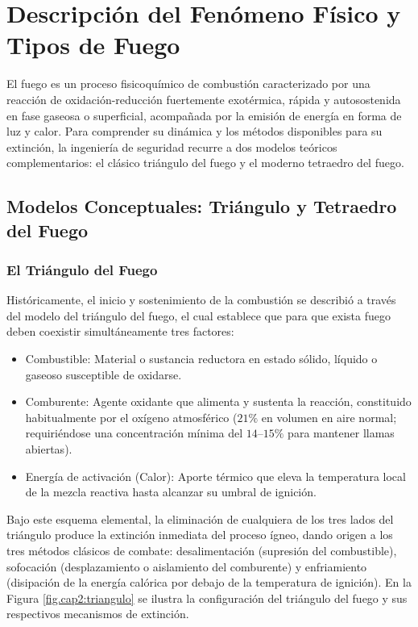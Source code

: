 \chapter{Descripción del Fenómeno Físico y Tipos de Fuego}
\label{sec.cap2:fenomeno_fisico}

El fuego es un proceso fisicoquímico de combustión caracterizado por una reacción de oxidación-reducción fuertemente
exotérmica, rápida y autosostenida en fase gaseosa o superficial, acompañada por la emisión de energía en forma de luz
y calor. Para comprender su dinámica y los métodos disponibles para su extinción, la ingeniería de seguridad recurre a
dos modelos teóricos complementarios: el clásico triángulo del fuego y el moderno tetraedro del fuego.

\section{Modelos Conceptuales: Triángulo y Tetraedro del Fuego}
\label{sec.cap2:modelos_fuego}

\subsection{El Triángulo del Fuego}

Históricamente, el inicio y sostenimiento de la combustión se describió a través del modelo del triángulo del fuego,
el cual establece que para que exista fuego deben coexistir simultáneamente tres factores:

\begin{itemize}
    \item Combustible: Material o sustancia reductora en estado sólido, líquido o gaseoso susceptible de oxidarse.
    \item Comburente: Agente oxidante que alimenta y sustenta la reacción, constituido habitualmente por el oxígeno
          atmosférico ($21\percent$ en volumen en aire normal; requiriéndose una concentración mínima del $14\text{--}15\percent$
          para mantener llamas abiertas).
    \item Energía de activación (Calor): Aporte térmico que eleva la temperatura local de la mezcla reactiva hasta
          alcanzar su umbral de ignición.
\end{itemize}

Bajo este esquema elemental, la eliminación de cualquiera de los tres lados del triángulo produce la extinción inmediata
del proceso ígneo, dando origen a los tres métodos clásicos de combate: desalimentación (supresión del combustible),
sofocación (desplazamiento o aislamiento del comburente) y enfriamiento (disipación de la energía calórica por debajo de
la temperatura de ignición). En la Figura \ref{fig.cap2:triangulo} se ilustra la configuración del triángulo del fuego y
sus respectivos mecanismos de extinción.

